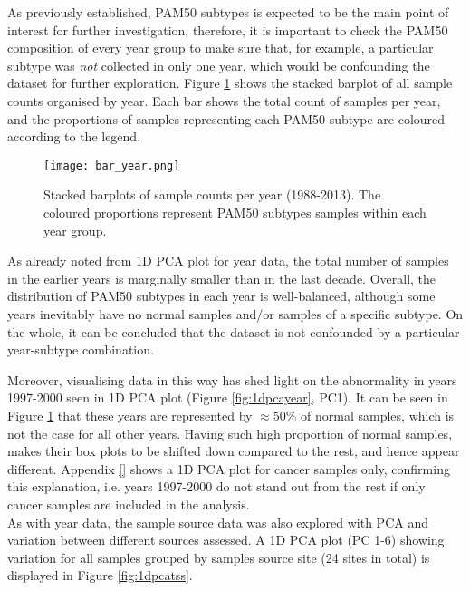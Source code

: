     \newpage
    As previously established, PAM50 subtypes is expected to be the main point of interest for further investigation, therefore, it is important to check the PAM50 composition of every year group to make sure that, for example, a particular subtype was \textit{not} collected in only one year, which would be confounding the dataset for further exploration. Figure \ref{fig:baryear} shows the stacked barplot of all sample counts organised by year. Each bar shows the total count of samples per year, and the proportions of samples representing each PAM50 subtype are coloured according to the legend. \\
    \newline
    
    
            \begin{figure}[!h]
            \centering
            \texttt{[image: bar\_year.png]}
            \caption{Stacked barplots of sample counts per year (1988-2013). The coloured proportions represent PAM50 subtypes samples within each year group. }
            \label{fig:baryear}
            \end{figure}
    
    As already noted from 1D PCA plot for year data, the total number of samples in the earlier years is marginally smaller than in the last decade. Overall, the distribution of PAM50 subtypes in each year is well-balanced,  although some years inevitably have no normal samples and/or samples of a specific subtype. On the whole, it can be concluded that the dataset is not confounded by a particular year-subtype combination.  
    
    Moreover, visualising data in this way has shed light on the abnormality in years 1997-2000 seen in 1D PCA plot (Figure \ref{fig:1dpcayear}, PC1). It can be seen in Figure \ref{fig:baryear} that these years are represented by $\approx50\%$ of normal samples, which is not the case for all other years. Having such high proportion of normal samples, makes their box plots to be shifted down compared to the rest, and hence appear different. Appendix \ref{} shows a 1D PCA plot for cancer samples only, confirming this explanation, i.e. years 1997-2000 do not stand out from the rest if only cancer samples are included in the analysis. \\
    

    As with year data, the sample source data was also explored with PCA and variation between different sources assessed. A 1D PCA plot (PC 1-6) showing variation for all samples grouped by samples source site (24 sites in total) is displayed in Figure \ref{fig:1dpcatss}. 
    
